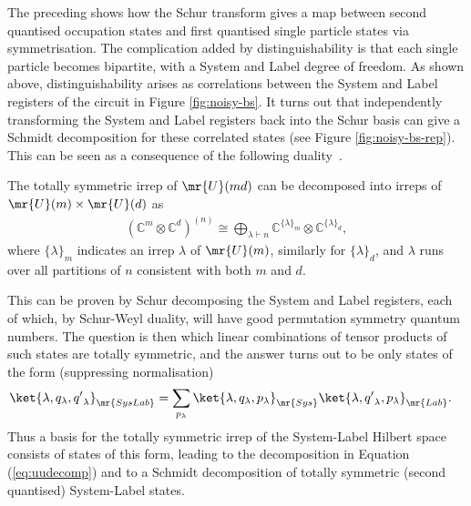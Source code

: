 The preceding shows how the Schur transform gives a map between second quantised occupation states and first quantised single particle states via symmetrisation.
The complication added by distinguishability is that each single particle becomes bipartite, with a System and Label degree of freedom.
As shown above, distinguishability arises as correlations between the System and Label registers of the circuit in Figure \ref{fig:noisy-bs}.
It turns out that independently transforming the System and Label registers back into the Schur basis can give a Schmidt decomposition for these correlated states (see Figure \ref{fig:noisy-bs-rep}).
This can be seen as a consequence of the following duality~\cite{goodman2009, rowe2012}.
\begin{theorem}\label{thm:unitary-unitary}
The totally symmetric irrep of $\mr{U}(md)$ can be decomposed into irreps of $\mr{U}(m) \times \mr{U}(d)$ as
\begin{align}\label{eq:uudecomp}
(\mathbb{C}^{m} \otimes \mathbb{C}^{d})^{(n)} \cong \bigoplus_{\lambda\vdash n} \mathbb{C}^{\{\lambda\}_m} \otimes \mathbb{C}^{\{\lambda\}_d} ,
\end{align}
where $\{\lambda\}_m$ indicates an irrep $\lambda$ of $\mr{U}(m)$, similarly for $\{\lambda\}_d$, and $\lambda$ runs over all partitions of $n$ consistent with both $m$ and $d$.
\end{theorem}
This can be proven by Schur decomposing the System and Label registers, each of which, by Schur-Weyl duality, will have good permutation symmetry quantum numbers.
The question is then which linear combinations of tensor products of such states are totally symmetric, and the answer turns out to be only states of the form (suppressing normalisation)~\cite{hamermesh1962}
\begin{align}\label{eq:symSL}
\ket{\lambda, q_\lambda, {q'}_\lambda}_\mr{SysLab} &=  \sum_{p_\lambda} \ket{\lambda, q_\lambda, p_\lambda}_\mr{Sys} \ket{\lambda, {q'}_\lambda, p_\lambda}_\mr{Lab} .
\end{align}
Thus a basis for the totally symmetric irrep of the System-Label Hilbert space consists of states of this form, leading to the decomposition in Equation (\ref{eq:uudecomp}) and to a Schmidt decomposition of totally symmetric (second quantised) System-Label states.

